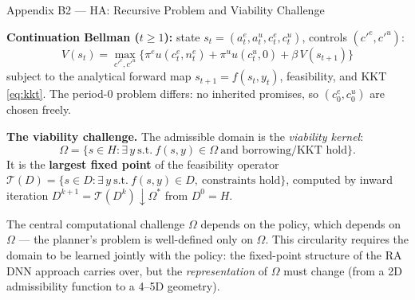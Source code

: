 \documentclass[10pt,aspectratio=169]{beamer}
\begin{document}
\begin{frame}[label=appHArec]{Appendix B2 --- HA: Recursive Problem and Viability Challenge}
\hfill\hyperlink{mainM2fb}{}
\vspace{0.2em}

\textbf{Continuation Bellman ($t\ge1$):} state $s_t=(a^e_t,a^u_t,c^e_t,c^u_t)$, controls $(c'^e,c'^u)$:
\[
V(s_t)=\max_{c'^e,c'^u}\Big\{\pi^e u(c^e_t,n^e_t)+\pi^u u(c^u_t,0)+\beta\,V(s_{t+1})\Big\}
\]
subject to the analytical forward map $s_{t+1}=f(s_t,y_t)$, feasibility, and KKT \eqref{eq:kkt}.
The period-0 problem differs: no inherited promises, so $(c^e_0,c^u_0)$ are chosen freely.

\smallskip
\textbf{The viability challenge.} The admissible domain is the \emph{viability kernel}:
\[
\Omega = \big\{s\in H:\exists\,y\ \text{s.t.}\ f(s,y)\in\Omega\ \text{and borrowing/KKT hold}\big\}.
\]
It is the \textbf{largest fixed point} of the feasibility operator
$\mathcal{T}(D)=\{s\in D:\exists\,y\ \text{s.t.}\ f(s,y)\in D,\ \text{constraints hold}\}$,
computed by inward iteration $D^{k+1}=\mathcal{T}(D^k)\downarrow\Omega^*$ from $D^0=H$.

\begin{alertblock}{The central computational challenge}
\small $\Omega$ depends on the policy, which depends on $\Omega$ --- the planner's problem is
well-defined only on $\Omega$. This circularity requires the domain to be learned jointly with
the policy: the fixed-point structure of the RA DNN approach carries over, but the
\emph{representation} of $\Omega$ must change (from a 2D admissibility function to a 4--5D geometry).
\end{alertblock}
\end{frame}
\end{document}
